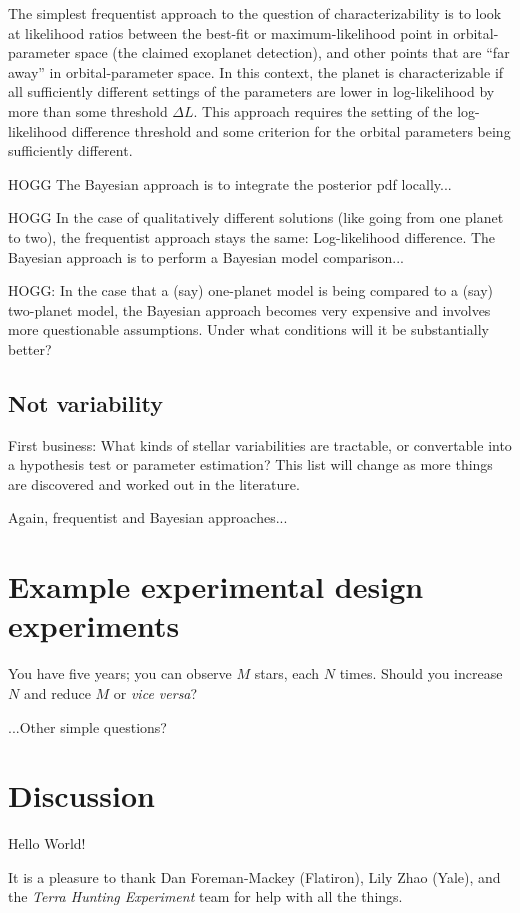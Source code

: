 \documentclass[modern]{aastex63}
\newcommand{\foreign}[1]{\textsl{#1}}
\newcommand{\project}[1]{\textsl{#1}}
\begin{document}
The simplest frequentist approach to the question of
characterizability is to look at likelihood ratios between the
best-fit or maximum-likelihood point in orbital-parameter space (the
claimed exoplanet detection), and other points that are ``far away''
in orbital-parameter space.
In this context, the planet is characterizable if all sufficiently
different settings of the parameters are lower in log-likelihood by
more than some threshold $\Delta L$.
This approach requires the setting of the log-likelihood difference
threshold and some criterion for the orbital parameters being
sufficiently different.

HOGG The Bayesian approach is to integrate the posterior pdf locally...

HOGG In the case of qualitatively different solutions (like going from one
planet to two), the frequentist approach stays the same:
Log-likelihood difference. The Bayesian approach is to perform a
Bayesian model comparison...

HOGG: In the case that a (say) one-planet model is being compared to a
(say) two-planet model, the Bayesian approach becomes very expensive
and involves more questionable assumptions. Under what conditions will
it be substantially better?

\subsection{Not variability}

First business: What kinds of stellar variabilities are tractable, or
convertable into a hypothesis test or parameter estimation? This list
will change as more things are discovered and worked out in the
literature.

Again, frequentist and Bayesian approaches...

\section{Example experimental design experiments}

You have five years; you can observe $M$ stars, each $N$ times. Should
you increase $N$ and reduce $M$ or \foreign{vice versa}?

...Other simple questions?

\section{Discussion}

Hello World!

\acknowledgments

It is a pleasure to thank
  Dan Foreman-Mackey (Flatiron),
  Lily Zhao (Yale),
  and
  the \project{Terra Hunting Experiment} team
for help with all the things.

\software{
}



\end{document}
